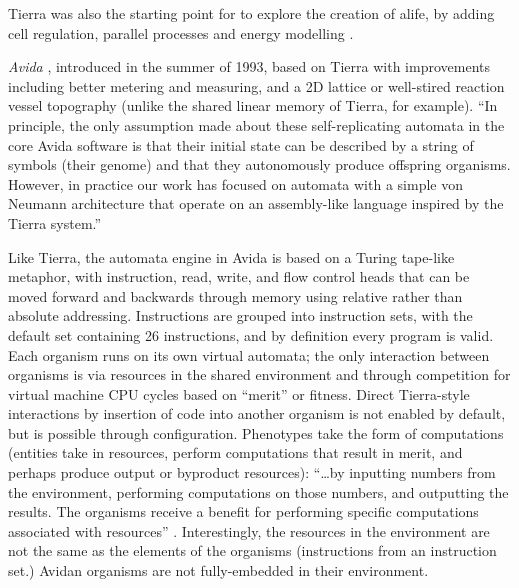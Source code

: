 Tierra was also the starting point for \cite{Taylor2001, Taylor:1999sc} to explore the creation of \gls{alife}, by adding cell regulation, parallel processes and energy modelling \cite[p.4]{Taylor:1999sc}.



\emph{Avida} \parencite{Ofria2004}, introduced in the summer of 1993, based on Tierra with improvements including better metering and measuring, and a 2D lattice or well-stired reaction vessel topography (unlike the shared linear memory of Tierra, for example). ``In principle, the only assumption made about these self-replicating automata in the core Avida software is that their initial state can be described by a string of symbols (their genome) and that they autonomously produce offspring organisms. However, in practice our work has focused on automata with a simple von Neumann architecture that operate on an assembly-like language inspired by the Tierra system.''

Like Tierra, the automata engine in Avida is based on a Turing tape-like metaphor, with instruction, read, write, and flow control heads that can be moved forward and backwards through memory using relative rather than absolute addressing. Instructions are grouped into instruction sets, with the default set containing 26 instructions, and by definition every program is valid. Each organism runs on its own virtual automata; the only interaction between organisms is via resources in the shared environment and through competition for virtual machine CPU cycles based on ``merit'' or fitness. Direct Tierra-style interactions by insertion of code into another organism is not enabled by default, but is possible through configuration. Phenotypes take the form of computations (entities take in resources, perform computations that result in merit, and perhaps produce output or byproduct resources): ``\ldots by inputting numbers from the environment, performing computations on those numbers, and outputting the results. The organisms receive a benefit for performing specific computations associated with resources'' \parencite{Ofria2004}. Interestingly, the resources in the environment are not the same as the elements of the organisms (instructions from an instruction set.) Avidan organisms are not fully-embedded in their environment.

